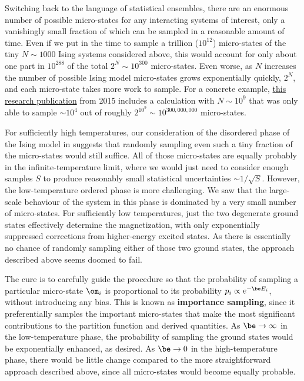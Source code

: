 Switching back to the language of statistical ensembles, there are an enormous number of possible micro-states for any interacting systems of interest, only a vanishingly small fraction of which can be sampled in a reasonable amount of time.
Even if we put in the time to sample a trillion ($10^{12}$) micro-states of the tiny $N \sim 1000$ Ising systems considered above, this would account for only about one part in $10^{288}$ of the total $2^N \sim 10^{300}$ micro-states.
Even worse, as $N$ increases the number of possible Ising model micro-states grows exponentially quickly, $2^N$, and each micro-state takes more work to sample.
For a concrete example, \href{https://arxiv.org/abs/1502.07613}{this research publication} from 2015 includes a calculation with $N \sim 10^9$ that was only able to sample $\sim 10^4$ out of roughly $2^{10^9} \sim 10^{300{,}000{,}000}$ micro-states. %

For sufficiently high temperatures, our consideration of the disordered phase of the Ising model in  suggests that randomly sampling even such a tiny fraction of the micro-states would still suffice.
All of those micro-states are equally probably in the infinite-temperature limit, where we would just need to consider enough samples $S$ to produce reasonably small statistical uncertainties $\sim 1 / \sqrt{S}$.
However, the low-temperature ordered phase is more challenging.
We saw that the large-scale behaviour of the system in this phase is dominated by a very small number of micro-states.
For sufficiently low temperatures, just the two degenerate ground states effectively determine the magnetization, with only exponentially suppressed corrections from higher-energy excited states.
As there is essentially no chance of randomly sampling either of those two ground states, the approach described above seems doomed to fail.

The cure is to carefully guide the procedure so that the probability of sampling a particular micro-state $\om_i$ is proportional to its probability $p_i \propto e^{-\be E_i}$, without introducing any bias.
This is known as \textbf{importance sampling}, since it preferentially samples the important micro-states that make the most significant contributions to the partition function and derived quantities.
As $\be \to \infty$ in the low-temperature phase, the probability of sampling the ground states would be exponentially enhanced, as desired.
As $\be \to 0$ in the high-temperature phase, there would be little change compared to the more straightforward approach described above, since all micro-states would become equally probable.

